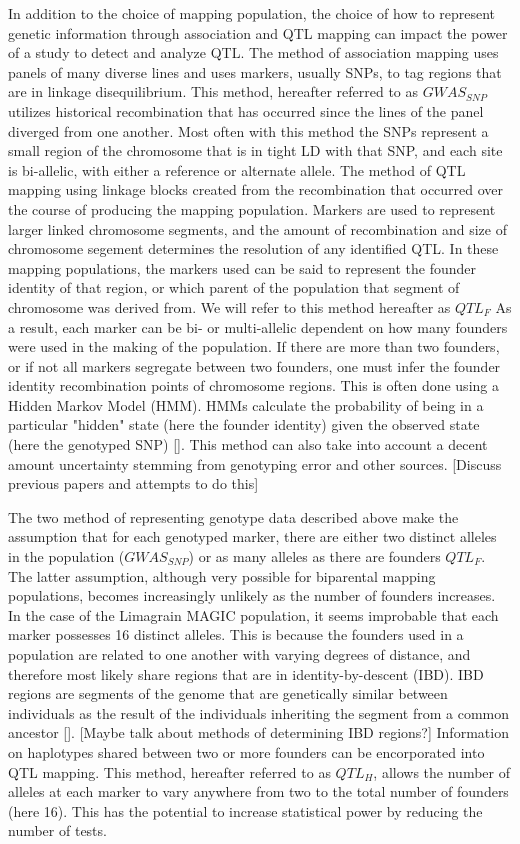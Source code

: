 \documentclass[article,9pt,twocolumn,twoside]{rilabRxiv}
\begin{document}
In addition to the choice of mapping population, the choice of how to represent genetic information through association and QTL mapping can impact the power of a study to detect and analyze QTL. The method of association mapping uses panels of many diverse lines and uses markers, usually SNPs, to tag regions that are in linkage disequilibrium. This method, hereafter referred to as $GWAS_{SNP}$ utilizes historical recombination that has occurred since the lines of the panel diverged from one another. Most often with this method the SNPs represent a small region of the chromosome that is in tight LD with that SNP, and each site is bi-allelic, with either a reference or alternate allele.
The method of QTL mapping using linkage blocks created from the recombination that occurred over the course of producing the mapping population. Markers are used to represent larger linked chromosome segments, and the amount of recombination and size of chromosome segement determines the resolution of any identified QTL. In these mapping populations, the markers used can be said to represent the founder identity of that region, or which parent of the population that segment of chromosome was derived from. We will refer to this method hereafter as $QTL_F$ As a result, each marker can be bi- or multi-allelic dependent on how many founders were used in the making of the population. If there are more than two founders, or if not all markers segregate between two founders, one must infer the founder identity recombination points of chromosome regions. This is often done using a Hidden Markov Model (HMM). HMMs calculate the probability of being in a particular "hidden" state (here the founder identity) given the observed state (here the genotyped SNP) []. This method can also take into account a decent amount uncertainty stemming from genotyping error and other sources. [Discuss previous papers and attempts to do this]

The two method of representing genotype data described above make the assumption that for each genotyped marker, there are either two distinct alleles in the population ($GWAS_{SNP}$) or as many alleles as there are founders $QTL_F$. The latter assumption, although very possible for biparental mapping populations, becomes increasingly unlikely as the number of founders increases. In the case of the Limagrain MAGIC population, it seems improbable that each marker possesses 16 distinct alleles. This is because the founders used in a population are related to one another with varying degrees of distance, and therefore most likely share regions that are in identity-by-descent (IBD). IBD regions are segments of the genome that are genetically similar between individuals as the result of the individuals inheriting the segment from a common ancestor []. [Maybe talk about methods of determining IBD regions?] Information on haplotypes shared between two or more founders can be encorporated into QTL mapping. This method, hereafter referred to as $QTL_H$, allows the number of alleles at each marker to vary anywhere from two to the total number of founders (here 16). This has the potential to increase statistical power by reducing the number of tests.
\end{document}
